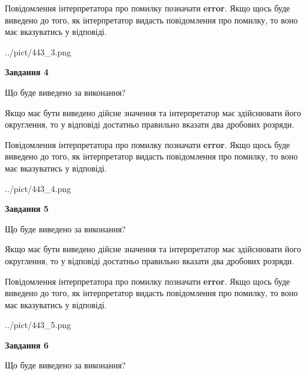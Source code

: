 \documentclass[12pt, ukrainian]{article}
\begin{document}
{\begin {Large}
Повідомлення інтерпретатора про помилку позначати \textbf{error}.
Якщо щось буде виведено до того, як інтерпретатор видасть повідомлення про помилку, 
то воно має вказуватись у відповіді. \par

\begin{center}
	{../pict/443_3.png}
\end{center}
\newpage

{\begin {center}\textbf{Завдання 4}\end {center}}\par
Що буде виведено за виконання? \par

Якщо має бути виведено дійсне значення та інтерпретатор має здійснювати його округлення, 
то у відповіді достатньо правильно вказати два дробових розряди.

Повідомлення інтерпретатора про помилку позначати \textbf{error}.
Якщо щось буде виведено до того, як інтерпретатор видасть повідомлення про помилку, 
то воно має вказуватись у відповіді. \par

\begin{center}
	{../pict/443_4.png}
\end{center}
\newpage

{\begin {center}\textbf{Завдання 5}\end {center}}\par
Що буде виведено за виконання? \par

Якщо має бути виведено дійсне значення та інтерпретатор має здійснювати його округлення, 
то у відповіді достатньо правильно вказати два дробових розряди.

Повідомлення інтерпретатора про помилку позначати \textbf{error}.
Якщо щось буде виведено до того, як інтерпретатор видасть повідомлення про помилку, 
то воно має вказуватись у відповіді. \par

\begin{center}
	{../pict/443_5.png}
\end{center}
\newpage

{\begin {center}\textbf{Завдання 6}\end {center}}\par
Що буде виведено за виконання? \par


\end{Large}}
\end{document}
